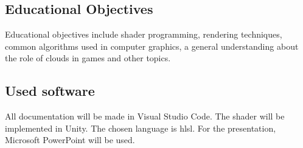 \subsection{Educational Objectives}
Educational objectives include shader programming, rendering techniques, common algorithms used in computer graphics, a general understanding about the role of clouds in games and other topics.

\subsection{Used software}
All documentation will be made in Visual Studio Code.
The shader will be implemented in Unity. The chosen language is \gls{hlsl}.
For the presentation, Microsoft PowerPoint will be used.